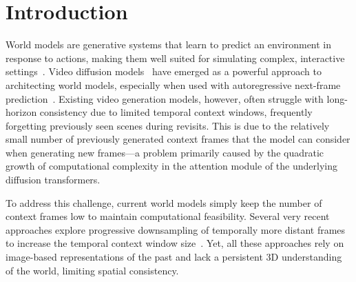 \section{Introduction}
\label{sec:intro}


World models are generative systems that learn to predict an environment in response to actions, making them well suited for simulating complex, interactive settings~\cite{ha2018worldmodels, authorsgenesis,hafner2019dream,wu2023daydreamer,zhu2024sora}.
%
Video diffusion models~\cite{brooks2024video,ho2022video,kong2024hunyuanvideo,yang2024cogvideox,po2024state} have emerged as a powerful approach to architecting world models, especially when used with autoregressive next-frame prediction~\cite{alonso2024diffusion,che2024gamegen,decart2024oasis,feng2024matrix,jin2024pyramidal,parker2024genie,song2025history,valevski2024diffusion,weng2024art,yu2025gamefactory,streamingt2v}.
%
Existing video generation models, however, often struggle with long-horizon consistency due to limited temporal context windows, frequently forgetting previously seen scenes during revisits. 
%
This is due to the relatively small number of previously generated context frames that the model can consider when generating new frames---a problem primarily caused by the quadratic growth of computational complexity in the attention module of the underlying diffusion transformers.

To address this challenge, current world models simply keep the number of context frames low to maintain computational feasibility. Several very recent approaches explore progressive downsampling of temporally more distant frames to increase the temporal context window size~\cite{Gu2025LongContextAV,Zhang2025PackingIF}. Yet, all these approaches rely on image-based representations of the past and lack a persistent 3D understanding of the world, limiting spatial consistency.

